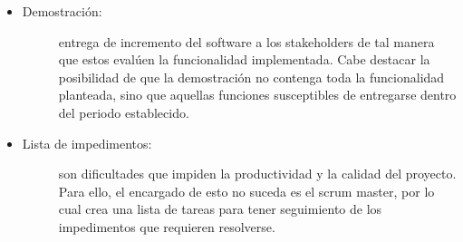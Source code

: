 \begin{itemize}
    \item   \begin{description}
                \item[Demostración:] entrega de incremento del software a los stakeholders de tal manera que estos evalúen la funcionalidad implementada. Cabe destacar la posibilidad de que la demostración no contenga toda la funcionalidad planteada, sino que aquellas funciones susceptibles de entregarse dentro del periodo establecido.
            \end{description}
    
    \item   \begin{description}
                \item[Lista de impedimentos: ]  son dificultades que impiden la productividad y la calidad del proyecto. Para ello, el encargado de esto no suceda es el scrum master, por lo cual crea una lista de tareas para tener seguimiento de los impedimentos que requieren resolverse. 
        
            \end{description}
\end{itemize}

